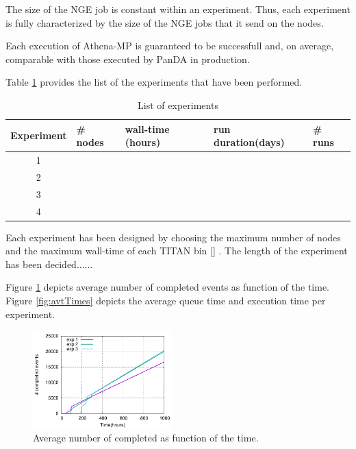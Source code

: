 The size of the NGE job is constant within an experiment. Thus, each experiment is fully characterized by the size of the NGE jobs that it send on the nodes.

Each execution of Athena-MP is guaranteed to be successfull and, on average, comparable with those executed by PanDA in production.

Table \ref{tab:experiments} provides the list of the experiments that have been performed.

\begin{table}
\begin{center}
\begin{tabular}{|c|l|l|l|l|}
  \hline
Experiment &\# nodes &wall-time (hours) & run duration(days) & \# runs   \\
\hline
1 & &  & &   \\
2 & &  & &  \\
3 & &  & &  \\
4 & &  & &  \\
\hline
\end{tabular}
\end{center}
\caption{List of experiments}\label{tab:experiments}
\end{table}

Each experiment has been designed by choosing the maximum number of nodes and the maximum wall-time of each TITAN bin \ref{} . The length of the experiment has been decided......

Figure \ref{fig:avtEvts} depicts average number of completed events as function of the time. Figure \ref{fig:avtTimes}  depicts the average queue time and execution time per experiment.

\begin{figure}[!htb]
        \includegraphics[width=0.48\textwidth]{./figures/draft/mean.pdf}
    \caption{Average number of completed as function of the time.}
\label{fig:avtEvts}
\end{figure}

